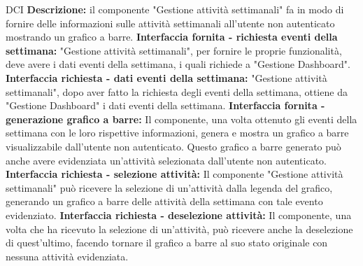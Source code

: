\begin{listaPersonale}{DCI}
    \textbf{Descrizione:} il componente "Gestione attività settimanali" fa in modo di fornire delle informazioni sulle attività settimanali all'utente non autenticato mostrando un grafico a barre.
    \textbf{Interfaccia fornita - richiesta eventi della settimana:} "Gestione attività settimanali", per fornire le proprie funzionalità, deve avere i dati eventi della settimana, i quali richiede a "Gestione Dashboard".
    \textbf{Interfaccia richiesta - dati eventi della settimana:} "Gestione attività settimanali", dopo aver fatto la richiesta degli eventi della settimana, ottiene da "Gestione Dashboard" i dati eventi della settimana.
    \textbf{Interfaccia fornita - generazione grafico a barre:} Il componente, una volta ottenuto gli eventi della settimana con le loro rispettive informazioni, genera e mostra un grafico a barre visualizzabile dall'utente non autenticato. Questo grafico a barre generato può anche avere evidenziata un'attività selezionata dall'utente non autenticato.
    \textbf{Interfaccia richiesta - selezione attività:} Il componente "Gestione attività settimanali" può ricevere la selezione di un'attività dalla legenda del grafico, generando un grafico a barre delle attività della settimana con tale evento evidenziato.
    \textbf{Interfaccia richiesta - deselezione attività:} Il componente, una volta che ha ricevuto la selezione di un'attività, può ricevere anche la deselezione di quest'ultimo, facendo tornare il grafico a barre al suo stato originale con nessuna attività evidenziata.



\end{listaPersonale}
